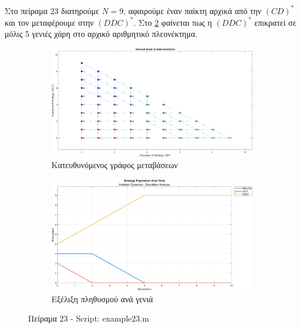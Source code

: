 \documentclass[12pt]{report}
\begin{document}
Στο πείραμα 23 διατηρούμε $N=9$, αφαιρούμε έναν παίκτη αρχικά από την $(CD)^*$ και τον μεταφέρουμε στην $(DDC)^*$. Στο \ref{fig:fig23-sim} φαίνεται πως η $(DDC)^*$ επικρατεί σε μόλις 5 γενιές χάρη στο αρχικό αριθμητικό πλεονέκτημα.
\begin{figure}[H]
    \centering

    \begin{subfigure}[b]{0.45\textwidth}
        \includegraphics[width=\linewidth]{Figures Imitation Dynamics/example23.png}
        \caption{Κατευθυνόμενος γράφος μεταβάσεων}
        \label{fig:fig23}
    \end{subfigure}
    \hfill
    \begin{subfigure}[b]{0.45\textwidth}
        \includegraphics[width=\linewidth]{Figures Imitation Dynamics/example23-sim.png}
        \caption{Εξέλιξη πληθυσμού ανά γενιά}
        \label{fig:fig23-sim}
    \end{subfigure}

    \caption{Πείραμα 23 - \foreignlanguage{english}{Script: example23.m}}
    \label{fig:example23}
\end{figure}
\end{document}
